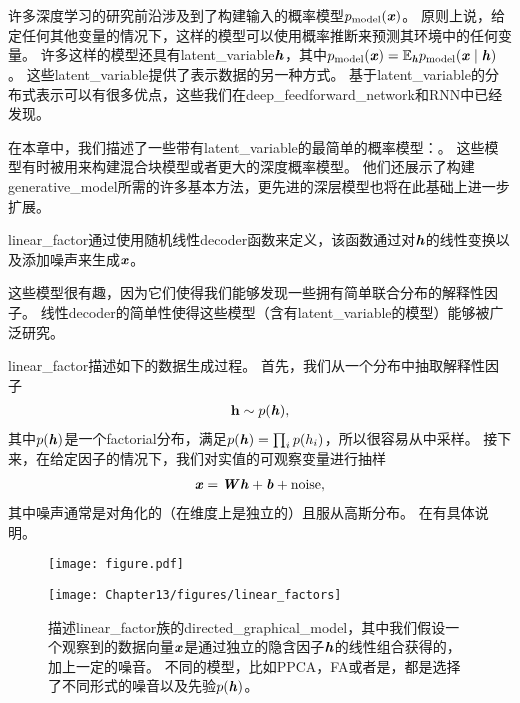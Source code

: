 \chapter{}
\label{chap:linear_factor_models}




许多深度学习的研究前沿涉及到了构建输入的概率模型$p_{\text{model}}(\boldsymbol{\mathit{x}})$。
原则上说，给定任何其他变量的情况下，这样的模型可以使用概率推断来预测其环境中的任何变量。
许多这样的模型还具有\gls{latent_variable}$\boldsymbol{\mathit{h}}$，其中$p_{\text{model}}(\boldsymbol{\mathit{x}}) = \mathbb{E}_{\boldsymbol{\mathit{h}}} p_{\text{model}}(\boldsymbol{\mathit{x}}\mid\boldsymbol{\mathit{h}})$。
这些\gls{latent_variable}提供了表示数据的另一种方式。
 基于\gls{latent_variable}的分布式表示可以有很多优点，这些我们在\gls{deep_feedforward_network}和\gls{RNN}中已经发现。


在本章中，我们描述了一些带有\gls{latent_variable}的最简单的概率模型：。
这些模型有时被用来构建混合块模型\citep{Hinton-nips95,ghahramani96em,Roweis+Saul+Hinton-2002}或者更大的深度概率模型\citep{tang2012deep}。
他们还展示了构建\gls{generative_model}所需的许多基本方法，更先进的深层模型也将在此基础上进一步扩展。


\gls{linear_factor}通过使用随机线性\gls{decoder}函数来定义，该函数通过对$\boldsymbol{\mathit{h}}$的线性变换以及添加噪声来生成$\boldsymbol{\mathit{x}}$。


这些模型很有趣，因为它们使得我们能够发现一些拥有简单联合分布的解释性因子。 
线性\gls{decoder}的简单性使得这些模型（含有\gls{latent_variable}的模型）能够被广泛研究。


\gls{linear_factor}描述如下的数据生成过程。 
首先，我们从一个分布中抽取解释性因子
\begin{align}
\label{eqn:131}
\mathbf{h} \sim p(\boldsymbol{\mathit{h}}),
\end{align}
其中$p(\boldsymbol{\mathit{h}})$是一个\gls{factorial}分布，满足$p(\boldsymbol{\mathit{h}}) = \prod_{i}^{}p(h_i)$，所以很容易从中采样。
接下来，在给定因子的情况下，我们对实值的可观察变量进行抽样
\begin{align}
\label{eqn:132}
\boldsymbol{\mathit{x}} = \boldsymbol{\mathit{W}} \boldsymbol{\mathit{h}} + \boldsymbol{\mathit{b}} + \text{noise},
\end{align}
其中噪声通常是对角化的（在维度上是独立的）且服从高斯分布。
在有具体说明。

\begin{figure}[!htb]
\ifOpenSource
\centerline{\texttt{[image: figure.pdf]}}
\else
	\centerline{\texttt{[image: Chapter13/figures/linear\_factors]}}
\fi
	\caption{描述\gls{linear_factor}族的\gls{directed_graphical_model}，其中我们假设一个观察到的数据向量$\boldsymbol{\mathit{x}}$是通过独立的隐含因子$\boldsymbol{\mathit{h}}$的线性组合获得的，加上一定的噪音。
		不同的模型，比如\gls{PPCA}，\gls{FA}或者是，都是选择了不同形式的噪音以及先验$p(\boldsymbol{\mathit{h}})$。}
	\label{fig:linear_factors}
\end{figure}


